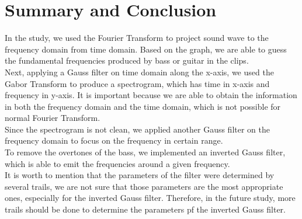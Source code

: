\documentclass{article}
\begin{document}
\newpage
\section{Summary and Conclusion}
In the study, we used the Fourier Transform to project sound wave to the frequency domain from time domain. Based on the graph, we are able to guess the fundamental frequencies produced by bass or guitar in the clips. \\
Next, applying a Gauss filter on time domain along the x-axis, we used the Gabor Transform to produce a spectrogram, which has time in x-axis and frequency in y-axis. It is important because we are able to obtain the information in both the frequency domain and the time domain, which is not possible for normal Fourier Transform. \\
Since the spectrogram is not clean, we applied another Gauss filter on the frequency domain to focus on the frequency in certain range. \\
To remove the overtones of the bass, we implemented an inverted Gauss filter, which is able to emit the frequencies around a given frequency. \\
It is worth to mention that the parameters of the filter were determined by several trails, we are not sure that those parameters are the most appropriate ones, especially for the inverted Gauss filter. Therefore, in the future study, more trails should be done to determine the parameters pf the inverted Gauss filter.
\newpage
\end{document}
